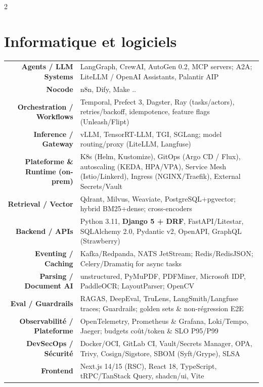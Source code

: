 \documentclass{modernsimplecv}
\newlength{\leftcolwidth}
\begin{document}
\begin{paracol}{2}

\footnotesize

\begin{minipage}[t]{\leftcolwidth}
\normalsize
\section*{Informatique et logiciels}
\begin{tabular}{>{\footnotesize\bfseries}r >{\footnotesize}p{}}
Agents / LLM Systems & LangGraph, CrewAI, AutoGen 0.2, MCP servers; A2A; LiteLLM / OpenAI Assistants, Palantir AIP \\
Nocode & n8n, Dify, Make .. \\
Orchestration / Workflows & Temporal, Prefect 3, Dagster, Ray (tasks/actors), retries/backoff, idempotence, feature flags (Unleash/Flipt) \\
Inference / Gateway & vLLM, TensorRT-LLM, TGI, SGLang; model routing/proxy (LiteLLM, Langfuse) \\
Plateforme \& Runtime (on-prem) & K8s (Helm, Kustomize), GitOps (Argo CD / Flux), autoscaling (KEDA, HPA/VPA), Service Mesh (Istio/Linkerd), Ingress (NGINX/Traefik), External Secrets/Vault \\
Retrieval / Vector & Qdrant, Milvus, Weaviate, PostgreSQL+pgvector; hybrid BM25+dense; cross-encoders \\
Backend / APIs & Python 3.11, \textbf{Django 5 + DRF}, FastAPI/Litestar, SQLAlchemy 2.0, Pydantic v2, OpenAPI, GraphQL (Strawberry) \\
Eventing / Caching & Kafka/Redpanda, NATS JetStream; Redis/RedisJSON; Celery/Dramatiq for async tasks \\
Parsing / Document AI & unstructured, PyMuPDF, PDFMiner, Microsoft IDP, PaddleOCR; LayoutParser; OpenCV \\
Eval / Guardrails & RAGAS, DeepEval, TruLens, LangSmith/Langfuse traces; Guardrails; golden sets \& non-régression E2E \\
Observabilité / Plateforme & OpenTelemetry, Prometheus \& Grafana, Loki/Tempo, Jaeger; budgets coût/token \& SLO P95/P99 \\
DevSecOps / Sécurité & Docker/OCI, GitLab CI, Vault/Secrets Manager, OPA, Trivy, Cosign/Sigstore, SBOM (Syft/Grype), SLSA \\
Frontend & Next.js 14/15 (RSC), React 18, TypeScript, tRPC/TanStack Query, shadcn/ui, Vite \\
\end{tabular}
\vspace{0.5cm}












\end{minipage}
\end{paracol}
\end{document}
